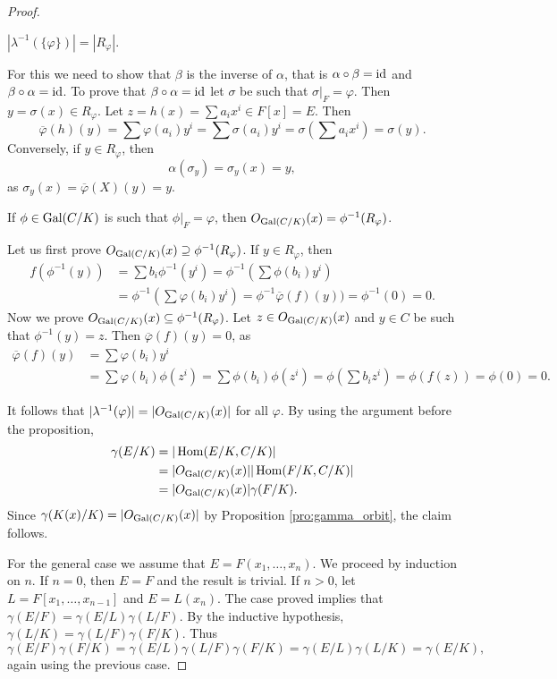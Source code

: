 \begin{proof}
    \begin{claim}
        $|\lambda^{-1}(\{\varphi\})|=|R_\varphi|$. 
    \end{claim}
    
    For this we need to show that $\beta$ is
    the inverse of $\alpha$, that is 
    $\alpha\circ\beta=\operatorname{id}$ and $\beta\circ\alpha=\operatorname{id}$. 
    To prove that $\beta\circ\alpha=\operatorname{id}$ 
    let $\sigma$ be such that $\sigma|_F=\varphi$. 
    Then $y=\sigma(x)\in R_\varphi$. Let
    $z=h(x)=\sum a_ix^i\in F[x]=E$. Then  
    \[
    \overline{\varphi}(h)(y)=\sum\varphi(a_i)y^i=\sum\sigma(a_i)y^i
    =\sigma\left(\sum a_ix^i\right)=\sigma(y).
    \]
    Conversely, if $y\in R_\varphi$, then
    \[
    \alpha(\sigma_y)=\sigma_y(x)=y,
    \]
    as $\sigma_y(x)=\overline{\varphi}(X)(y)=y$.
    
    \begin{claim}
        If $\phi\in\operatorname{Gal}(C/K)$ is such that $\phi|_F=\varphi$, then 
        $O_{\operatorname{Gal}(C/K)}(x)=\phi^{-1}(R_\varphi)$.
    \end{claim}

    Let us first prove $O_{\operatorname{Gal}(C/K)}(x)\supseteq \phi^{-1}(R_\varphi)$.
    If $y\in R_{\varphi}$, 
    then 
    \begin{align*}
    f(\phi^{-1}(y))&=\sum b_i\phi^{-1}(y^i)=\phi^{-1}\left(\sum\phi(b_i)y^i\right)\\
    &=\phi^{-1}\left(\sum\varphi(b_i)y^i\right)=\phi^{-1}\overline{\varphi}(f)(y))=\phi^{-1}(0)=0.
    \end{align*}
    Now we prove $O_{\operatorname{Gal}(C/K)}(x)\subseteq\phi^{-1}(R_\varphi)$.
    Let $z\in O_{\operatorname{Gal}(C/K)}(x)$ and $y\in C$ be such that 
    $\phi^{-1}(y)=z$. Then $\overline{\varphi}(f)(y)=0$, as
    \begin{align*}
    \overline{\varphi}(f)(y)&=\sum\varphi(b_i)y^i\\
    &=\sum\varphi(b_i)\phi(z^i)
    =\sum\phi(b_i)\phi(z^i)=\phi\left(\sum b_iz^i\right)=\phi(f(z))=\phi(0)=0.
    \end{align*}
    
    \medskip
    It follows that $|\lambda^{-1}(\varphi)|=|O_{\operatorname{Gal}(C/K)}(x)|$ for
    all $\varphi$. By using the argument
    before the proposition, 
    \begin{align*}
    \gamma(E/K)&=|\operatorname{Hom}(E/K,C/K)|\\
        &=|O_{\operatorname{Gal}(C/K)}(x)||\operatorname{Hom}(F/K,C/K)|\\
        &=|O_{\operatorname{Gal}(C/K)}(x)|\gamma(F/K).
    \end{align*}
    Since $\gamma(K(x)/K)=|O_{\operatorname{Gal}(C/K)}(x)|$ by Proposition \ref{pro:gamma_orbit}, the claim follows. 
    
    \medskip 
    For the general case we assume that $E=F(x_1,\dots,x_n)$. We proceed
    by induction on $n$. If $n=0$, then $E=F$ and the result is trivial. 
    If $n>0$, let $L=F[x_1,\dots,x_{n-1}]$ and $E=L(x_n)$. The 
    case proved 
    implies that $\gamma(E/F)=\gamma(E/L)\gamma(L/F)$. By the inductive 
    hypothesis, $\gamma(L/K)=\gamma(L/F)\gamma(F/K)$. Thus 
    \[
    \gamma(E/F)\gamma(F/K)=\gamma(E/L)\gamma(L/F)\gamma(F/K)
    =\gamma(E/L)\gamma(L/K)=\gamma(E/K),
    \]
    again using the previous case. 
\end{proof}

